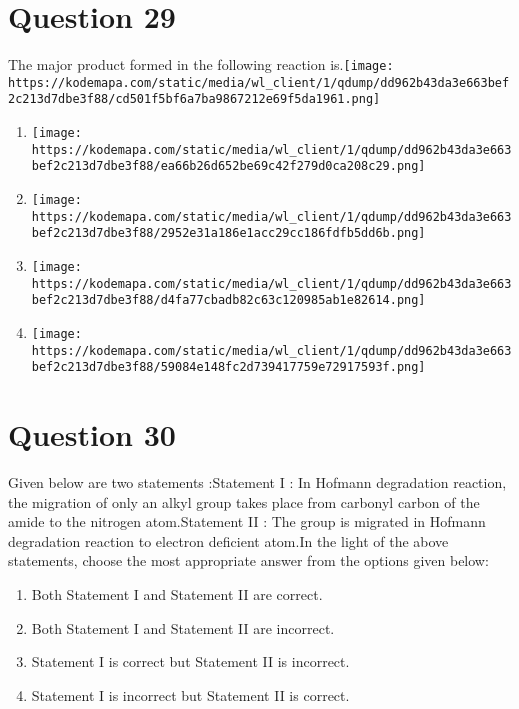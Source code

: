 \documentclass{article}
\begin{document}
\section*{Question 29}
The major product formed in the following reaction is.\texttt{[image: https://kodemapa.com/static/media/wl\_client/1/qdump/dd962b43da3e663bef2c213d7dbe3f88/cd501f5bf6a7ba9867212e69f5da1961.png]}\newline
\begin{enumerate}[label=(\alph*)]
\item \texttt{[image: https://kodemapa.com/static/media/wl\_client/1/qdump/dd962b43da3e663bef2c213d7dbe3f88/ea66b26d652be69c42f279d0ca208c29.png]}
\item \texttt{[image: https://kodemapa.com/static/media/wl\_client/1/qdump/dd962b43da3e663bef2c213d7dbe3f88/2952e31a186e1acc29cc186fdfb5dd6b.png]}
\item \texttt{[image: https://kodemapa.com/static/media/wl\_client/1/qdump/dd962b43da3e663bef2c213d7dbe3f88/d4fa77cbadb82c63c120985ab1e82614.png]}
\item \texttt{[image: https://kodemapa.com/static/media/wl\_client/1/qdump/dd962b43da3e663bef2c213d7dbe3f88/59084e148fc2d739417759e72917593f.png]}
\end{enumerate}
\newpage
\section*{Question 30}
Given below are two statements :Statement I : In Hofmann degradation reaction, the migration of only an alkyl group takes place from carbonyl carbon of the amide to the nitrogen atom.Statement II : The group is migrated in Hofmann degradation reaction to electron deficient atom.In the light of the above statements, choose the most appropriate answer from the options given below: 
\begin{enumerate}[label=(\alph*)]
\item Both Statement I and Statement II are correct.
\item Both Statement I and Statement II are incorrect.
\item Statement I is correct but Statement II is incorrect.
\item Statement I is incorrect but Statement II is correct.
\end{enumerate}
\newpage
\end{document}
